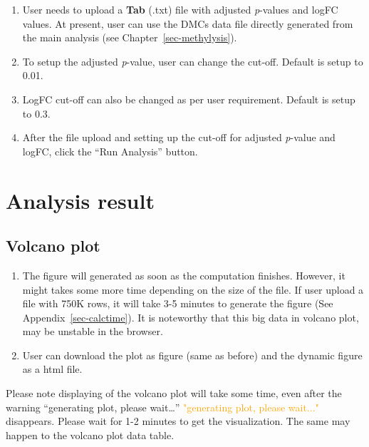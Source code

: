 \documentclass[
  a4paper,
  oneside,
  open=any]{scrreport}
\providecommand{\tightlist}{%
  \setlength{\itemsep}{0pt}\setlength{\parskip}{0pt}}\usepackage{longtable,booktabs,array}
\begin{document}
\begin{enumerate}
\def\labelenumi{\arabic{enumi}.}
\tightlist
\item
  User needs to upload a \textbf{Tab} (.txt) file with adjusted
  \emph{p}-values and logFC values. At present, user can use the DMCs
  data file directly generated from the main analysis (see
  Chapter~\ref{sec-methylysis}).
\item
  To setup the adjusted \emph{p}-value, user can change the cut-off.
  Default is setup to 0.01.
\item
  LogFC cut-off can also be changed as per user requirement. Default is
  setup to 0.3.
\item
  After the file upload and setting up the cut-off for adjusted
  \emph{p}-value and logFC, click the ``Run Analysis'' button.
\end{enumerate}

\hypertarget{analysis-result-2}{%
\section{Analysis result}\label{analysis-result-2}}

\hypertarget{volcano-plot}{%
\subsection{Volcano plot}\label{volcano-plot}}

\begin{enumerate}
\def\labelenumi{\arabic{enumi}.}
\tightlist
\item
  The figure will generated as soon as the computation finishes.
  However, it might takes some more time depending on the size of the
  file. If user upload a file with 750K rows, it will take 3-5 minutes
  to generate the figure (See Appendix~\ref{sec-calctime}). It is
  noteworthy that this big data in volcano plot, may be unstable in the
  browser.
\item
  User can download the plot as figure (same as before) and the dynamic
  figure as a html file.\\
\end{enumerate}

\begin{tcolorbox}[enhanced jigsaw, bottomrule=.15mm, left=2mm, coltitle=black, breakable, colback=white, arc=.35mm, rightrule=.15mm, opacitybacktitle=0.6, toptitle=1mm, leftrule=.75mm, toprule=.15mm, bottomtitle=1mm, opacityback=0, colbacktitle=quarto-callout-note-color!10!white, titlerule=0mm, colframe=quarto-callout-note-color-frame, title=\textcolor{quarto-callout-note-color}{\faInfo}\hspace{0.5em}{Note}]

Please note displaying of the volcano plot will take some time, even
after the warning {``generating plot, please wait\ldots{}''}
\textcolor{orange}{"generating plot, please wait..."} disappears. Please
wait for 1-2 minutes to get the visualization. The same may happen to
the volcano plot data table.

\end{tcolorbox}
\end{document}
